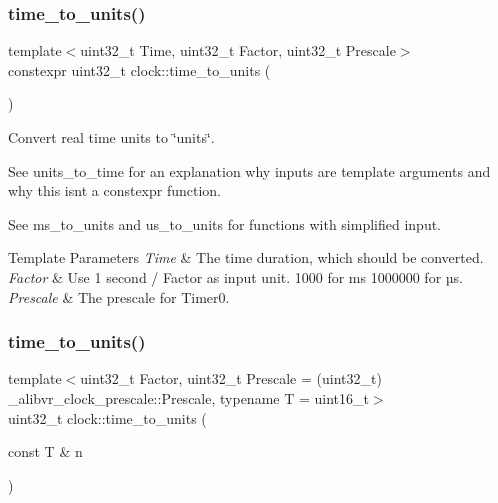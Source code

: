 \subsubsection{\texorpdfstring{time\+\_\+to\+\_\+units()}{time\_to\_units()}\hspace{0.1cm}{\footnotesize\ttfamily [1/2]}}
{\footnotesize\ttfamily template$<$uint32\+\_\+t Time, uint32\+\_\+t Factor, uint32\+\_\+t Prescale$>$ \\
constexpr uint32\+\_\+t clock\+::time\+\_\+to\+\_\+units (\begin{DoxyParamCaption}{ }\end{DoxyParamCaption})}



Convert real time units to \char`\"{}units\char`\"{}. 

See units\+\_\+to\+\_\+time for an explanation why inputs are template arguments and why this isn\textquotesingle{}t a constexpr function.

See ms\+\_\+to\+\_\+units and us\+\_\+to\+\_\+units for functions with simplified input.


\begin{DoxyTemplParams}{Template Parameters}
{\em Time} & The time duration, which should be converted. \\
\hline
{\em Factor} & Use 1 second / Factor as input unit. 1\textquotesingle{}000 for ms 1\textquotesingle{}000\textquotesingle{}000 for µs. \\
\hline
{\em Prescale} & The prescale for {\ttfamily Timer0}. \\
\hline
\end{DoxyTemplParams}
\hypertarget{namespaceclock_a46fd6e3a91d0b307eeea0500d03d12fb}{}\label{namespaceclock_a46fd6e3a91d0b307eeea0500d03d12fb} 
\subsubsection{\texorpdfstring{time\+\_\+to\+\_\+units()}{time\_to\_units()}\hspace{0.1cm}{\footnotesize\ttfamily [2/2]}}
{\footnotesize\ttfamily template$<$uint32\+\_\+t Factor, uint32\+\_\+t Prescale = (uint32\+\_\+t) \+\_\+alibvr\+\_\+clock\+\_\+prescale\+::\+Prescale, typename T  = uint16\+\_\+t$>$ \\
uint32\+\_\+t clock\+::time\+\_\+to\+\_\+units (\begin{DoxyParamCaption}\item[{const T \&}]{n }\end{DoxyParamCaption})\hspace{0.3cm}{\ttfamily [inline]}}



